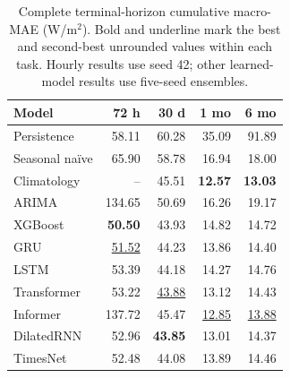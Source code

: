 \begin{table}[!htbp]
\centering
\scriptsize
\setlength{\tabcolsep}{3pt}
\caption{Complete terminal-horizon cumulative macro-MAE (W/m$^2$). Bold and underline mark the best and second-best unrounded values within each task. Hourly results use seed 42; other learned-model results use five-seed ensembles.}
\label{tab:benchmark_adicional_mae}
\begin{tabular}{@{}lrrrr@{}}
\toprule
Model & 72 h & 30 d & 1 mo & 6 mo \\
\midrule
Persistence & 58.11 & 60.28 & 35.09 & 91.89 \\
Seasonal na\"ive & 65.90 & 58.78 & 16.94 & 18.00 \\
Climatology & -- & 45.51 & \textbf{12.57} & \textbf{13.03} \\
ARIMA & 134.65 & 50.69 & 16.26 & 19.17 \\
XGBoost & \textbf{50.50} & 43.93 & 14.82 & 14.72 \\
GRU & \underline{51.52} & 44.23 & 13.86 & 14.40 \\
LSTM & 53.39 & 44.18 & 14.27 & 14.76 \\
Transformer & 53.22 & \underline{43.88} & 13.12 & 14.43 \\
Informer & 137.72 & 45.47 & \underline{12.85} & \underline{13.88} \\
DilatedRNN & 52.96 & \textbf{43.85} & 13.01 & 14.37 \\
TimesNet & 52.48 & 44.08 & 13.89 & 14.46 \\
\bottomrule
\end{tabular}
\end{table}
